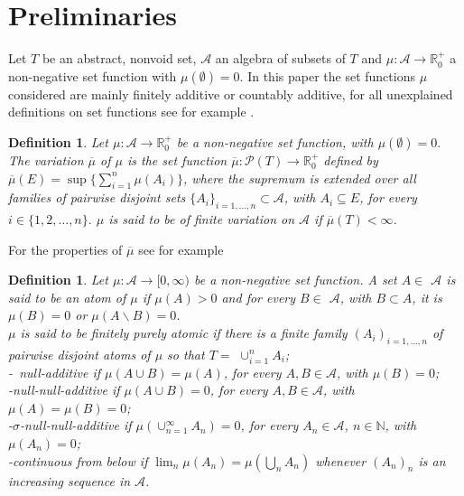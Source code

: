 \documentclass[11pt,a4paper,twoside]{amsart}
\newtheorem{definition}[theorem]{Definition}
\begin{document}
\section{Preliminaries}\label{two}

Let $T$ be an abstract, nonvoid set, $\mathcal{A}$ an algebra of subsets of $
T$ and \mbox{$\mu :\mathcal{A}\rightarrow \mathbb{R}_0^+$} a non-negative set
function with $\mu (\emptyset )=0.$ 
In this paper the set functions $\mu$ considered are mainly finitely additive or countably additive, for  all unexplained definitions on set functions see for example \cite{cg2014}.\\

\begin{definition}\label{ex2.2} \rm  \cite{ggg}
 Let $\mu :\mathcal{A}\rightarrow  \mathbb{R}_0^+$ be a non-negative set function, with $\mu (\emptyset )=0.$
\textit{The variation} $\overline{\mu}$ of $\mu $ is the set function 
$\overline{\mu }:\mathcal{P}(T)\rightarrow  \mathbb{R}_0^+$ defined by 
$\overline{\mu }(E)=\sup \{\sum\limits_{i=1}^{n}\mu (A_{i})\}$, 
where the supremum is extended over all families of
pairwise disjoint sets $\{A_{i}\}_{i=1,\ldots,n}\subset \mathcal{A}$,
with $A_{i}\subseteq E$, for every $i\in \{1,2,\ldots,n\}.$
$\mu $ is said to be \textit{of finite variation on }$\mathcal{A}$ if $\overline{\mu }(T)<\infty $.
\end{definition}
For the properties of  $\overline{\mu}$ see for example \cite[Remark 2.3]{cg2014}

\begin{definition}\label{ex2.4} \rm 
 Let $\mu :\mathcal{A}\rightarrow \lbrack 0,\infty )$
be a non-negative set function.
A set $A\in $ $\mathcal{A}$ is said to be an \textit{atom} of $\mu $ if 
$\mu (A)>0$ and for every $B\in $ $\mathcal{A}$, with $B\subset A$, it is
$\mu (B)=0$ or $\mu (A\backslash B)=0$. \\
$\mu $ is said to be \textit{finitely purely atomic} if there is a
finite family $(A_{i})_{i=1,\ldots,n}$ of pairwise disjoint atoms of 
$\mu $ so that $T=$ $\cup_{i=1}^n A_{i}$;\\ 
-\textit{\ null-additive} if $\mu (A\cup B)=\mu (A)$, for every $A,B\in 
\mathcal{A}$, with $\mu (B)=0$;\\ 
-\textit{null-null-additive } if $\mu (A\cup B)=0$, for every $A,B\in 
\mathcal{A}$, with $\mu (A)=\mu (B)=0$;\\
-$\sigma$-\textit {null-null-additive } if $\mu (\cup_{n=1}^{\infty} A_{n})=0$, for every $A_{n}\in \mathcal{A}$, $n\in 
\mathbb{N}$, with $\mu (A_{n})=0$;\\
-\textit{continuous from below} if $\lim_n\mu(A_n)=\mu(\bigcup_n A_n)$ whenever $(A_n)_n$ is an increasing sequence in ${\mathcal{{A}}}$.
\end{definition}
\end{document}

